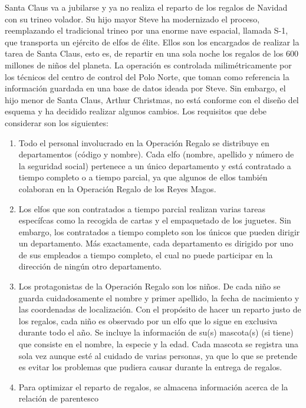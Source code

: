 \documentclass[a4paper, 11pt]{article}
\begin{document}
\begin{proy}
	Santa Claus va a jubilarse y ya no realiza el reparto de los regalos de Navidad con su trineo volador. Su
	hijo mayor Steve ha modernizado el proceso, reemplazando el tradicional trineo por una enorme nave
	espacial, llamada S-1, que transporta un ejército de elfos de élite. Ellos son los encargados de realizar la
	tarea de Santa Claus, esto es, de repartir en una sola noche los regalos de los 600 millones de niños del
	planeta. La operación es controlada milimétricamente por los técnicos del centro de control del Polo
	Norte, que toman como referencia la información guardada en una base de datos ideada por Steve. Sin
	embargo, el hijo menor de Santa Claus, Arthur Christmas, no está conforme con el diseño del esquema
	y ha decidido realizar algunos cambios. Los requisitos que debe considerar son los siguientes:
	\begin{enumerate}
		\item Todo el personal involucrado en la Operación Regalo se distribuye en departamentos (código
		y nombre). Cada elfo (nombre, apellido y número de la seguridad social) pertenece a un
		único departamento y está contratado a tiempo completo o a tiempo parcial, ya que algunos
		de ellos también colaboran en la Operación Regalo de los Reyes Magos.
		\item Los elfos que son contratados a tiempo parcial realizan varias tareas específcas como la recogida
		de cartas y el empaquetado de los juguetes. Sin embargo, los contratados a tiempo completo son
		los únicos que pueden dirigir un departamento. Más exactamente, cada departamento es dirigido
		por uno de sus empleados a tiempo completo, el cual no puede participar en la dirección de ningún
		otro departamento.
		\item Los protagonistas de la Operación Regalo son los niños. De cada niño se guarda cuidadosamente
		el nombre y primer apellido, la fecha de nacimiento y las coordenadas de localización. Con
		el propósito de hacer un reparto justo de los regalos, cada niño es observado por un elfo que lo
		sigue en exclusiva durante todo el año. Se incluye la información de su(s) mascota(s) (si tiene)
		que consiste en el nombre, la especie y la edad. Cada mascota se registra una sola vez aunque
		esté al cuidado de varias personas, ya que lo que se pretende es evitar los problemas que pudiera
		causar durante la entrega de regalos.
		\item Para optimizar el reparto de regalos, se almacena información acerca de la relación de parentesco

\end{enumerate}
\end{proy}
\end{document}
